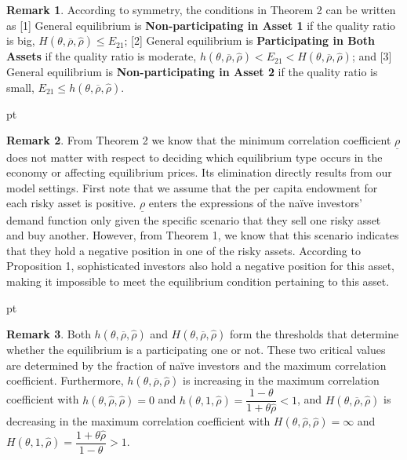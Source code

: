 \documentclass[10pt]{article}
\newcommand{\hhred}{\textcolor{red}}
\begin{document}

{\bf Remark 1}. According to symmetry, the conditions in Theorem 2 can be written as
[1] General equilibrium is {\bf Non-participating in Asset 1} if the quality ratio is big, $ H (\theta, \overline{\rho}, {\hat \rho}) \leqslant E_{2 1} $;
[2] General equilibrium is {\bf Participating in Both Assets} if the quality ratio is moderate, $ h (\theta, \overline{\rho}, {\hat \rho}) < E_{2 1} < H (\theta, \overline{\rho}, {\hat \rho}) $; and 
[3] General equilibrium is {\bf Non-participating in Asset 2} if the quality ratio is small, $ E_{2 1} \leqslant h (\theta, \overline{\rho}, {\hat \rho}) $.

 pt

{\bf Remark 2}. From Theorem 2 we know that the minimum correlation coefficient $ \underline{\rho} $ does not matter with respect to deciding which equilibrium type occurs in the economy or affecting equilibrium prices. Its elimination directly results from our model settings. First note that we assume that the per capita endowment for each risky asset is positive. $ \underline{\rho} $ enters the expressions of the na\"ive investors' demand function only given the specific scenario that they sell one risky asset and buy  another. However, from Theorem 1, we know that this scenario indicates that they hold a negative position in one of the risky assets. According to Proposition 1, sophisticated investors also hold a negative position for this asset, making it impossible to meet the equilibrium condition pertaining to this asset.

 pt

{\bf Remark 3}. Both $ h (\theta, \overline{\rho}, {\hat \rho}) $ and $ H (\theta, \overline{\rho}, {\hat \rho}) $ form the thresholds that determine whether the equilibrium is a participating one or not. These two critical values are determined by the fraction of na\"ive investors and the maximum correlation coefficient. Furthermore, $ h (\theta, \overline{\rho}, {\hat \rho}) $ is increasing in the maximum correlation coefficient with $ h (\theta, {\hat \rho}, {\hat \rho}) = 0 $ and $ h (\theta, 1, {\hat \rho}) = \dfrac{1 - \theta}{1 + \theta {\hat \rho}} < 1 $, and $ H (\theta, \overline{\rho}, {\hat \rho}) $ is decreasing in the maximum correlation coefficient with $ H (\theta, {\hat \rho}, {\hat \rho}) = \infty $ and $ H (\theta, 1, {\hat \rho}) = \dfrac{1 + \theta {\hat \rho}}{1 - \theta} > 1 $.
\end{document}
